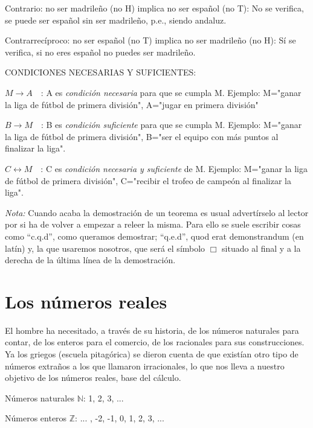 		\hspace{10mm} Contrario: no ser madrileño (no H) implica no ser español (no T): No se verifica, se puede ser español sin ser madrileño, p.e., siendo andaluz.
		
		\hspace{10mm} Contrarrecíproco: no ser español (no T) implica no ser madrileño (no H): Sí se verifica, si no eres español no puedes ser madrileño.
			
		\vspace{4mm} CONDICIONES NECESARIAS Y SUFICIENTES: 
		
		$M \to A \quad$: A es \emph{condición necesaria} para que se cumpla M. Ejemplo: M="ganar la liga de fútbol de primera división", A="jugar en primera división"	
		
		$B \to M \quad$: B es \emph{condición suficiente} para que se cumpla M. Ejemplo: M="ganar la liga de fútbol de primera división", B="ser el equipo con más puntos al finalizar la liga".
		
		$C \longleftrightarrow  M \quad$:  C es \emph{condición necesaria y suficiente} de M. Ejemplo: M="ganar la liga de fútbol de primera división", C="recibir el trofeo de campeón al finalizar la liga".
		
		
		\vspace{4mm} \emph{Nota:} Cuando acaba la demostración de un teorema es usual advertírselo al lector por si ha de volver a empezar a releer la misma. Para ello se suele escribir cosas como ``c.q.d'', como queramos demostrar; ``q.e.d'', quod erat demonstrandum (en latín) y, la que usaremos nosotros, que será el símbolo $\Box$ situado al final y a la derecha de la última línea de la demostración.
		
		

	\section{Los números reales}
	
	El hombre ha necesitado, a través de su historia, de los números naturales para contar, de los enteros para el comercio, de los racionales para sus construcciones. Ya los griegos (escuela pitagórica) se dieron cuenta de que existían otro tipo de números extraños a los que llamaron irracionales, lo que nos lleva a nuestro objetivo de los números reales, base del cálculo.
	
		Números naturales $\mathbb N$: 1, 2, 3, ...
	
		Números enteros $\mathbb Z$: ... , -2, -1, 0, 1, 2, 3, ...
	
